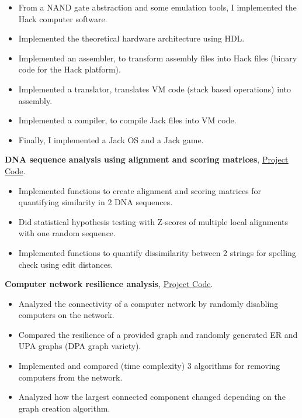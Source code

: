 \documentclass[a4paper,10pt]{article}
\newcommand{\ulink}[2]{\href{#1}{\underline{#2}}}
\begin{document}
\begin{itemize}[itemsep=0pt]
  \item From a NAND gate abstraction and some emulation tools, I implemented the Hack computer software.
  \item Implemented the theoretical hardware architecture using HDL.
  \item Implemented an assembler, to transform assembly files into Hack files (binary code for the Hack platform).
  \item Implemented a translator, translates VM code (stack based operations) into assembly.
  \item Implemented a compiler, to compile Jack files into VM code.
  \item Finally, I implemented a Jack OS and a Jack game.
\end{itemize}
\textbf{DNA sequence analysis using alignment and scoring matrices}, \ulink{https://github.com/rokobo/DNA-Sequence-Analysis}{Project Code}.
\begin{itemize}[itemsep=0pt]
  \item Implemented functions to create alignment and scoring matrices for quantifying similarity in 2 DNA sequences.
  \item Did statistical hypothesis testing with Z-scores of multiple local alignments with one random sequence.
  \item Implemented functions to quantify dissimilarity between 2 strings for spelling check using edit distances.
\end{itemize}
\textbf{Computer network resilience analysis}, \ulink{https://github.com/rokobo/Computer-Network-Resilience-Analysis}{Project Code}.
\begin{itemize}[itemsep=0pt]
  \item Analyzed the connectivity of a computer network by randomly disabling computers on the network.
  \item Compared the resilience of a provided graph and randomly generated ER and UPA graphs (DPA graph variety).
  \item Implemented and compared (time complexity) 3 algorithms for removing computers from the network.
  \item Analyzed how the largest connected component changed depending on the graph creation algorithm.
\end{itemize}
\end{document}
